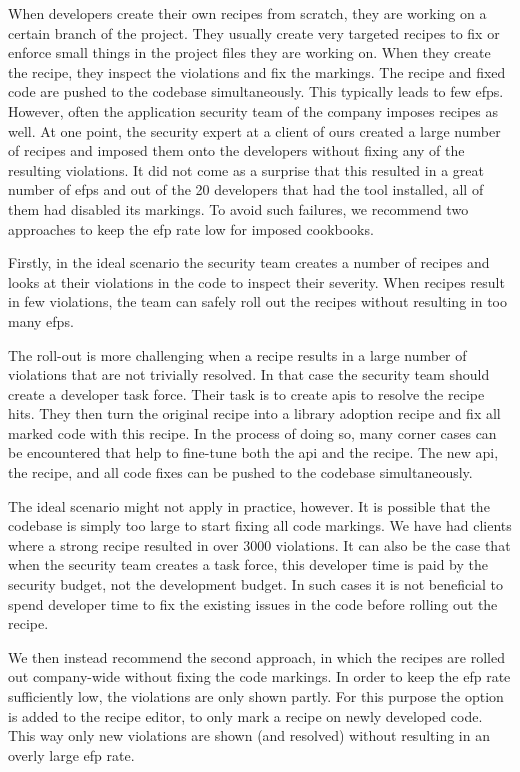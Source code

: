 When developers create their own recipes from scratch, they are working on a certain branch of the project.
They usually create very targeted recipes to fix or enforce small things in the project files they are working on.
When they create the recipe, they inspect the violations and fix the markings.
The recipe and fixed code are pushed to the codebase simultaneously.
This typically leads to few \glspl{efp}.
However, often the application security team of the company imposes recipes as well.
At one point, the security expert at a client of ours created a large number of recipes and imposed them onto the developers without fixing any of the resulting violations.
It did not come as a surprise that this resulted in a great number of \glspl{efp} and out of the 20 developers that had the tool installed, all of them had disabled its markings.
To avoid such failures, we recommend two approaches to keep the \gls{efp} rate low for imposed cookbooks.

Firstly, in the ideal scenario the security team creates a number of recipes and looks at their violations in the code to inspect their severity.
When recipes result in few violations, the team can safely roll out the recipes without resulting in too many \glspl{efp}.

The roll-out is more challenging when a recipe results in a large number of violations that are not trivially resolved.
In that case the security team should create a developer task force.
Their task is to create \glspl{api} to resolve the recipe hits.
They then turn the original recipe into a library adoption recipe and fix all marked code with this recipe.
In the process of doing so, many corner cases can be encountered that help to fine-tune both the \gls{api} and the recipe.
The new \gls{api}, the recipe, and all code fixes can be pushed to the codebase simultaneously. 

The ideal scenario might not apply in practice, however.
It is possible that the codebase is simply too large to start fixing all code markings.
We have had clients where a strong recipe resulted in over 3000 violations.
It can also be the case that when the security team creates a task force, this developer time is paid by the security budget, not the development budget.
In such cases it is not beneficial to spend developer time to fix the existing issues in the code before rolling out the recipe. 

We then instead recommend the second approach, in which the recipes are rolled out company-wide without fixing the code markings.
In order to keep the \gls{efp} rate sufficiently low, the violations are only shown partly.
For this purpose the option is added to the recipe editor, to only mark a recipe on newly developed code.
This way only new violations are shown (and resolved) without resulting in an overly large \gls{efp} rate.